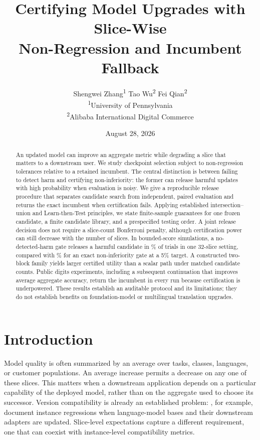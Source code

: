 \documentclass[11pt,letterpaper]{article}
\title{Certifying Model Upgrades with Slice-Wise\\Non-Regression and Incumbent Fallback}
\author{Shengwei Zhang\textsuperscript{1} \quad Tao Wu\textsuperscript{2} \quad Fei Qian\textsuperscript{2}\\
\textsuperscript{1}University of Pennsylvania\\
\textsuperscript{2}Alibaba International Digital Commerce}
\date{August 28, 2026}
\begin{document}
\maketitle
\begin{abstract}
An updated model can improve an aggregate metric while degrading a slice that matters to a downstream user. We study checkpoint selection subject to non-regression tolerances relative to a retained incumbent. The central distinction is between failing to detect harm and certifying non-inferiority: the former can release harmful updates with high probability when evaluation is noisy. We give a reproducible release procedure that separates candidate search from independent, paired evaluation and returns the exact incumbent when certification fails. Applying established intersection--union and Learn-then-Test principles, we state finite-sample guarantees for one frozen candidate, a finite candidate library, and a prespecified testing order. A joint release decision does not require a slice-count Bonferroni penalty, although certification power can still decrease with the number of slices. In bounded-score simulations, a no-detected-harm gate releases a harmful candidate in \NoharmRate\% of trials in one 32-slice setting, compared with \IutRate\% for an exact non-inferiority gate at a 5\% target. A constructed two-block family yields larger certified utility than a scalar path under matched candidate counts. Public digits experiments, including a subsequent continuation that improves average aggregate accuracy, return the incumbent in every run because certification is underpowered. These results establish an auditable protocol and its limitations; they do not establish benefits on foundation-model or multilingual translation upgrades.
\end{abstract}

\section{Introduction}
Model quality is often summarized by an average over tasks, classes, languages, or customer populations. An average increase permits a decrease on any one of these slices. This matters when a downstream application depends on a particular capability of the deployed model, rather than on the aggregate used to choose its successor. Version compatibility is already an established problem: \citet{echterhoff2024muscle}, for example, document instance regressions when language-model bases and their downstream adapters are updated. Slice-level expectations capture a different requirement, one that can coexist with instance-level compatibility metrics.
\end{document}
